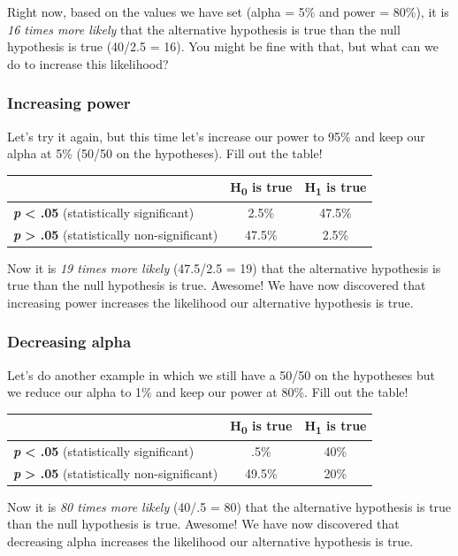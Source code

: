 \documentclass[
]{book}
\begin{document}
Right now, based on the values we have set (alpha = 5\% and power = 80\%), it is \emph{16 times more likely} that the alternative hypothesis is true than the null hypothesis is true (40/2.5 = 16). You might be fine with that, but what can we do to increase this likelihood?

\hypertarget{increasing-power}{%
\subsubsection{Increasing power}\label{increasing-power}}

Let's try it again, but this time let's increase our power to 95\% and keep our alpha at 5\% (50/50 on the hypotheses). Fill out the table!

\begin{longtable}[]{@{}lcc@{}}
\toprule
& H\textsubscript{0} is true & H\textsubscript{1} is true\tabularnewline
\midrule
\endhead
\textbf{\emph{p}} \textbf{\textless{} .05} (statistically significant) & 2.5\% & 47.5\%\tabularnewline
\textbf{\emph{p}} \textbf{\textgreater{} .05} (statistically non-significant) & 47.5\% & 2.5\%\tabularnewline
\bottomrule
\end{longtable}

Now it is \emph{19 times more likely} (47.5/2.5 = 19) that the alternative hypothesis is true than the null hypothesis is true. Awesome! We have now discovered that increasing power increases the likelihood our alternative hypothesis is true.

\hypertarget{decreasing-alpha}{%
\subsubsection{Decreasing alpha}\label{decreasing-alpha}}

Let's do another example in which we still have a 50/50 on the hypotheses but we reduce our alpha to 1\% and keep our power at 80\%. Fill out the table!

\begin{longtable}[]{@{}lcc@{}}
\toprule
& H\textsubscript{0} is true & H\textsubscript{1} is true\tabularnewline
\midrule
\endhead
\textbf{\emph{p}} \textbf{\textless{} .05} (statistically significant) & .5\% & 40\%\tabularnewline
\textbf{\emph{p}} \textbf{\textgreater{} .05} (statistically non-significant) & 49.5\% & 20\%\tabularnewline
\bottomrule
\end{longtable}

Now it is \emph{80 times more likely} (40/.5 = 80) that the alternative hypothesis is true than the null hypothesis is true. Awesome! We have now discovered that decreasing alpha increases the likelihood our alternative hypothesis is true.
\end{document}
